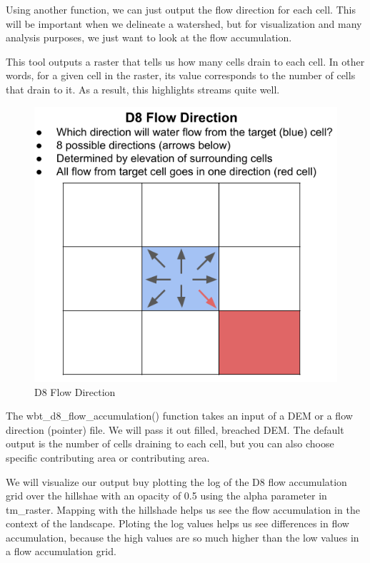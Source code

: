 \documentclass[
]{book}
\begin{document}
Using another function, we can just output the flow direction for each cell. This will be important when we delineate a watershed, but for visualization and many analysis purposes, we just want to look at the flow accumulation.

This tool outputs a raster that tells us how many cells drain to each cell. In other words, for a given cell in the raster, its value corresponds to the number of cells that drain to it. As a result, this highlights streams quite well.

\begin{figure}
\centering
\includegraphics{images/D8 flow direction.png}
\caption{D8 Flow Direction}
\end{figure}

The wbt\_d8\_flow\_accumulation() function takes an input of a DEM or a flow direction (pointer) file. We will pass it out filled, breached DEM. The default output is the number of cells draining to each cell, but you can also choose specific contributing area or contributing area.

We will visualize our output buy plotting the log of the D8 flow accumulation grid over the hillshae with an opacity of 0.5 using the alpha parameter in tm\_raster. Mapping with the hillshade helps us see the flow accumulation in the context of the landscape. Ploting the log values helps us see differences in flow accumulation, because the high values are so much higher than the low values in a flow accumulation grid.
\end{document}
